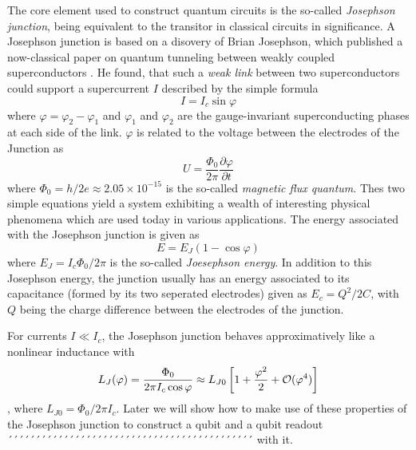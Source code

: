 The core element used to construct quantum circuits is the so-called {\it Josephson junction}, being equivalent to the transitor in classical circuits in significance. A Josephson junction is based on a disovery of Brian Josephson, which published a now-classical paper on quantum tunneling between weakly coupled superconductors \citep{josephson_possible_1962}. He found, that such a {\it weak link} between two superconductors could support a supercurrent $I$ described by the simple formula
%
\begin{equation}
I = I_c\sin{\varphi}
\end{equation}
%
where $\varphi = \varphi_2-\varphi_1$ and $\varphi_1$ and $\varphi_2$ are the gauge-invariant superconducting phases at each side of the link. $\varphi$ is related to the voltage between the electrodes of the Junction as
%
\begin{equation}
U = \frac{\Phi_0}{2\pi}\frac{\partial \varphi}{\partial t}
\end{equation}
%
where $\Phi_0 =h/2e \approx 2.05\times 10^{-15}$ is the so-called {\it magnetic flux quantum}. Thes two simple equations yield a system exhibiting a  wealth of interesting physical phenomena which are used today in various applications. The energy associated with the Josephson junction is given as
%
\begin{equation}
E = E_J(1-\cos{\varphi})
\end{equation}
%
where $E_J = I_c \Phi_0/2\pi$ is the so-called {\it Joesephson energy}. In addition to this Josephson energy, the junction usually has an energy associated to its capacitance (formed by its two seperated electrodes) given as $E_c = Q^2/2C$, with $Q$ being the charge difference between the electrodes of the junction.

\smallskip

For currents $I\ll I_c$, the Josephson junction behaves approximatively like a nonlinear inductance with
%
\begin{equation}
L_J(\varphi) = \frac{\Phi_0}{2\pi I_c \cos{\varphi}} \approx L_{J0}\left[1+\frac{\varphi^2}{2}+\begin{mathcal}O\end{mathcal}(\varphi^4)\right]\label{eq:josephson_inductance}
\end{equation}
%
, where $L_{J0}=\Phi_0/2\pi I_c$. Later we will show how to make use of these properties of the Josephson junction to construct a qubit and a qubit readout´´´´´´´´´´´´´´´´´´´´´´´´´´´´´´´´´´´´´´´´´´´´ with it.

